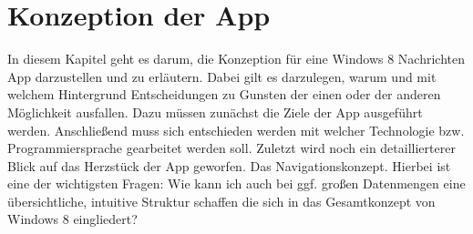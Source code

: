 \documentclass[12pt,a4paper]{scrartcl}
\begin{document}
\section{Konzeption der App}
\label{sec:konzeption}
In diesem Kapitel geht es darum, die Konzeption für eine Windows 8 Nachrichten App darzustellen und zu erläutern. Dabei gilt es darzulegen, warum und mit welchem Hintergrund Entscheidungen zu Gunsten der einen oder der anderen Möglichkeit ausfallen. Dazu müssen zunächst die Ziele der App ausgeführt werden. Anschließend muss sich entschieden werden mit welcher Technologie bzw. Programmiersprache gearbeitet werden soll. Zuletzt wird noch ein detaillierterer Blick auf das Herzstück der App geworfen. Das Navigationskonzept. Hierbei ist eine der wichtigsten Fragen: \glqq Wie kann ich auch bei ggf. großen Datenmengen eine übersichtliche, intuitive Struktur schaffen die sich in das Gesamtkonzept von Windows 8 eingliedert?\grqq  
\end{document}
